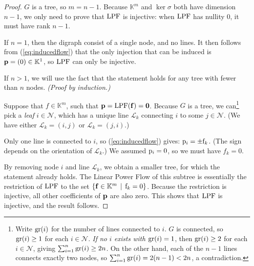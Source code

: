 \documentclass[main.tex]{subfiles}
\begin{document}
\begin{proof}
$G$ is a tree, so $m=n-1$. Because $\mathbb{K}^m$ and $\ker \sigma$ both have dimension $n-1$, we only need to prove that $\text{\textup{LPF}}$ is injective: when $\text{\textup{LPF}}$ has nullity $0$, it must have rank $n-1$. 

If $n=1$, then the digraph consist of a single node, and no lines. It then follows from (\ref{eq:inducedflow}) that the only injection that can be induced is $\mathbf{p}=(0) \in \mathbb{K}^1$, so $\text{\textup{LPF}}$ can only be injective.

If $n>1$, we will use the fact that the statement holds for any tree with fewer than $n$ nodes. \emph{(Proof by induction.)}

Suppose that $f \in \mathbb{K}^{m}$, such that $\mathbf{p}=\text{\textup{LPF}}(\mathbf{f})=\mathbf{0}$. Because $G$ is a tree, we can\footnote{Write $\operatorname{gr}(i)$ for the number of lines connected to $i$. $G$ is connected, so $\operatorname{gr}(i)\geq1$ for each $i \in \mathcal{N}$. \emph{If no $i$ exists with $\operatorname{gr}(i)=1$}, then $\operatorname{gr}(i)\geq 2$ for each $i \in \mathcal{N}$, giving $\sum_{i = 1}^n \operatorname{gr}(i) \geq 2n$. On the other hand, each of the $n-1$ lines connects exactly two nodes, so $\sum_{i = 1}^n \operatorname{gr}(i) = 2(n-1) < 2n$, a contradiction.} pick a \emph{leaf} $i \in \mathcal{N}$, which has a unique line $\mathcal{L}_k$ connecting $i$ to some $j \in \mathcal{N}$. (We have either $\mathcal{L}_k = (i,j)$ or $\mathcal{L}_k=(j,i)$.)

Only one line is connected to $i$, so (\ref{eq:inducedflow}) gives: ${\mathrm{p}}_i = \pm {\mathrm{f}}_k$. (The sign depends on the orientation of $\mathcal{L}_k$.) We assumed ${\mathrm{p}}_i=0$, so we must have $f_k = 0$.

By removing node $i$ and line $\mathcal{L}_k$, we obtain a smaller tree, for which the statement already holds. The Linear Power Flow of this subtree is essentially the restriction of $\text{\textup{LPF}}$ to the set $\left\{\mathbf{f} \in \mathbb{K}^m \, \mid \, {\mathrm{f}}_k = 0\right\}$. Because the restriction is injective, all other coefficients of $\mathbf{p}$ are also zero. This shows that $\text{\textup{LPF}}$ is injective, and the result follows.
\end{proof}
\end{document}
